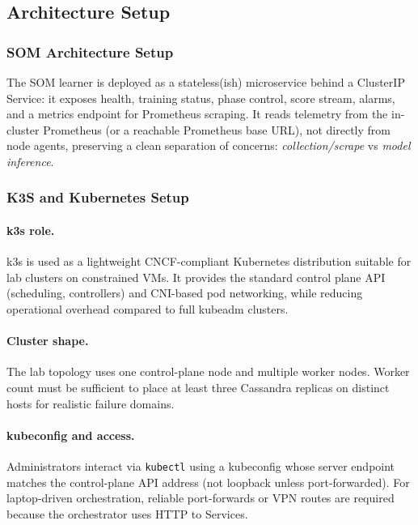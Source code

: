 \documentclass[11pt,a4paper]{article}
\begin{document}
\subsection{Architecture Setup}
\label{subsec:arch-setup}

\subsubsection{SOM Architecture Setup}
\label{subsubsec:arch-som}

The SOM learner is deployed as a stateless(ish) microservice behind a ClusterIP Service: it exposes health, training status, phase control, score stream, alarms, and a metrics endpoint for Prometheus scraping. It reads telemetry from the in-cluster Prometheus (or a reachable Prometheus base URL), not directly from node agents, preserving a clean separation of concerns: \emph{collection/scrape} vs \emph{model inference}.

\subsubsection{K3S and Kubernetes Setup}
\label{subsubsec:k3s}

\paragraph{k3s role.}
k3s is used as a lightweight CNCF-compliant Kubernetes distribution suitable for lab clusters on constrained VMs. It provides the standard control plane API (scheduling, controllers) and CNI-based pod networking, while reducing operational overhead compared to full kubeadm clusters.

\paragraph{Cluster shape.}
The lab topology uses one control-plane node and multiple worker nodes. Worker count must be sufficient to place at least three Cassandra replicas on distinct hosts for realistic failure domains.

\paragraph{kubeconfig and access.}
Administrators interact via \texttt{kubectl} using a kubeconfig whose server endpoint matches the control-plane API address (not loopback unless port-forwarded). For laptop-driven orchestration, reliable port-forwards or VPN routes are required because the orchestrator uses HTTP to Services.
\end{document}
